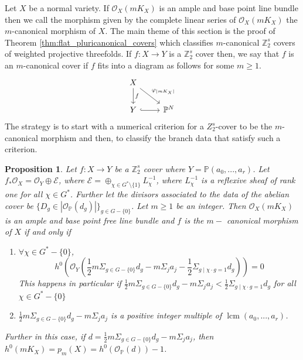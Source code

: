 \documentclass[12pt,twoside,]{amsart}
\theoremstyle{plain}
\newtheorem{proposition}[theorem]{Proposition}
\theoremstyle{definition}
\begin{document}
Let $X$ be a normal variety. If $\mathcal{O}_X(mK_X)$ is an ample and base point line bundle then we call the morphism given by the complete linear series of $\mathcal{O}_X(mK_X)$ the $m$-canonical morphism of $X$. The main theme of this section is the proof of Theorem \ref{thm:flat_pluricanonical_covers} which classifies $m$-canonical $\mathbb{Z}_2^s$ covers of weighted projective threefolds. If $f: X \to Y$ is a $\mathbb{Z}_2^s$ cover then, we say that $f$ is an $m$-canonical cover if $f$ fits into a diagram as follows for some $m \geq 1$.
\[
\begin{tikzcd}
    X \arrow[d, "f"] \arrow[dr, "\varphi_{|mK_X|}"] & \\
    Y \arrow[r, hook] & \mathbb{P}^N
\end{tikzcd}
\]
The strategy is to start with a numerical criterion for a $Z_2^s$-cover to be the $m$-canonical morphism and then, to classify the branch data that satisfy such a criterion.





\begin{proposition}\label{prop:pluricanonical_maps_of_threefolds}
Let $f: X \to Y$ be a $\mathbb{Z}_2^s$ cover where $Y = \mathbb{P}(a_0,...,a_r)$. Let $f_*\mathcal{O}_X = \mathcal{O}_Y \oplus \mathcal{E}$, where $\mathcal{E} = \oplus_{\chi \in G^*\setminus\{1\}} L_{\chi}^{-1}$, where $L_{\chi}^{-1}$ is a reflexive sheaf of rank one for all $\chi \in G^*$. Further let the divisors associated to the data of the abelian cover be $\{D_g \in |\mathcal{O}_{\mathbb{P}}(d_g)|\}_{g \in G-\{0\}}$. Let $m \geq 1$ be an integer. Then $\mathcal{O}_X(mK_X)$ is an ample and base point free line bundle and $f$ is the $m-$ canonical morphism of $X$ if and only if
\begin{enumerate}
    \item $\forall \chi \in G^*-\{0\}$, $$h^0(\mathcal{O}_Y(\displaystyle\frac{1}{2}m \Sigma_{g \in G-\{0\}} d_g - m \Sigma_j a_j -\displaystyle\frac{1}{2} \Sigma_{g
     \mid \chi \cdot g = 1} d_g)) = 0$$ 
     This happens in particular if $\displaystyle\frac{1}{2}m \Sigma_{g \in G-\{0\}} d_g - m \Sigma_j a_j < \displaystyle\frac{1}{2} \Sigma_{g
     \mid \chi \cdot g = 1} d_g $ for all $\chi \in G^*-\{0\}$
    \item $\displaystyle\frac{1}{2}m \Sigma_{g \in G-\{0\}} d_g - m \Sigma_j a_j$ is a positive integer multiple of $\operatorname{lcm}(a_0,...,a_r)$.
\end{enumerate}
Further in this case, if $d = \displaystyle\frac{1}{2}m \Sigma_{g \in G-\{0\}} d_g - m \Sigma_j a_j$, then $h^0(mK_X) = p_m(X) = h^0(\mathcal{O}_{\mathbb{P}}(d))-1$.

\end{proposition}
\end{document}
